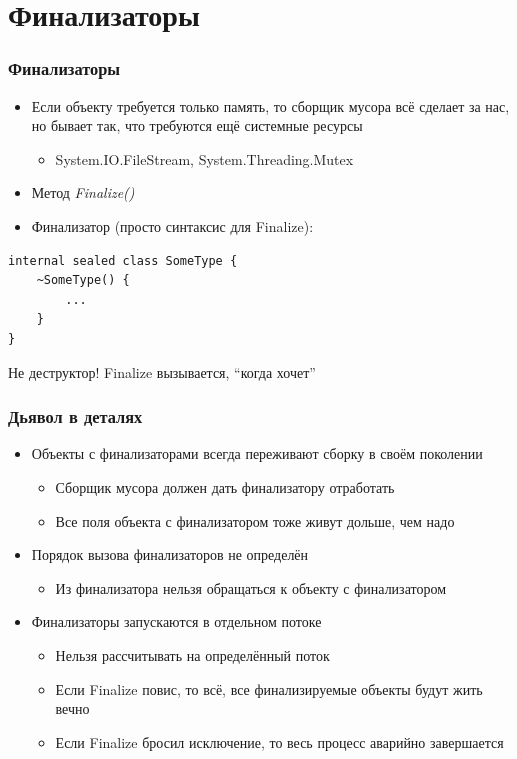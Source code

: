 \documentclass[xetex,mathserif,serif]{beamer}
\begin{document}
	\section{Финализаторы}

	\begin{frame}[fragile]
		\frametitle{Финализаторы}
		\begin{itemize}
			\item Если объекту требуется только память, то сборщик мусора всё сделает за нас, но бывает так, что требуются ещё системные ресурсы
			\begin{itemize}
				\item System.IO.FileStream, System.Threading.Mutex
			\end{itemize}
			\item Метод \textit{Finalize()}
			\item Финализатор (просто синтаксис для Finalize):
		\end{itemize}
		\begin{footnotesize}
			\begin{verbatim}
internal sealed class SomeType {
    ~SomeType() {
        ...
    }
}
			\end{verbatim}
		\end{footnotesize}
		Не деструктор! Finalize вызывается, ``когда хочет''
	\end{frame}

	\begin{frame}
		\frametitle{Дьявол в деталях}
		\begin{itemize}
			\item Объекты с финализаторами всегда переживают сборку в своём поколении
			\begin{itemize}
				\item Сборщик мусора должен дать финализатору отработать
				\item Все поля объекта с финализатором тоже живут дольше, чем надо
			\end{itemize}
			\item Порядок вызова финализаторов не определён
			\begin{itemize}
				\item Из финализатора нельзя обращаться к объекту с финализатором
			\end{itemize}
			\item Финализаторы запускаются в отдельном потоке
			\begin{itemize}
				\item Нельзя рассчитывать на определённый поток
				\item Если Finalize повис, то всё, все финализируемые объекты будут жить вечно
				\item Если Finalize бросил исключение, то весь процесс аварийно завершается
			\end{itemize}
		\end{itemize}
	\end{frame}
\end{document}
